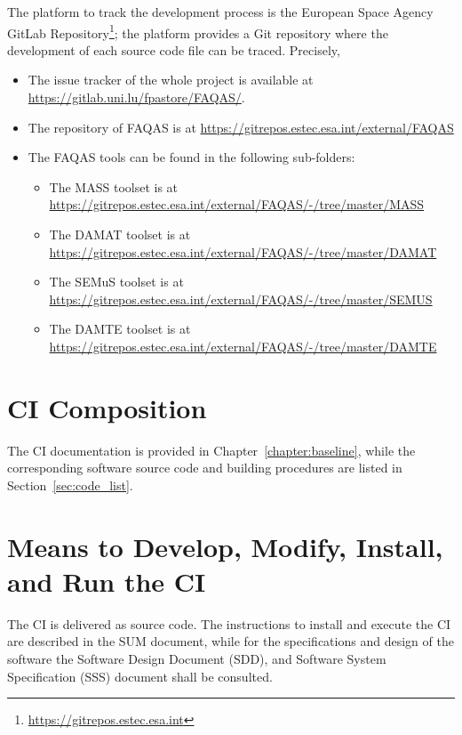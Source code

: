 The platform to track the development process is the European Space Agency GitLab Repository\footnote{\url{https://gitrepos.estec.esa.int}}; the platform provides a Git repository where the development of each source code file can be traced. Precisely,
\STARTCHANGEDFINAL
\begin{itemize}
\item The issue tracker of the whole project is available at \url{https://gitlab.uni.lu/fpastore/FAQAS/}.
\item The repository of FAQAS is at \url{https://gitrepos.estec.esa.int/external/FAQAS}
\item The FAQAS tools can be found in the following sub-folders:
\begin{itemize}
    \item The MASS toolset is at \url{https://gitrepos.estec.esa.int/external/FAQAS/-/tree/master/MASS}
    \item The DAMAT toolset is at \url{https://gitrepos.estec.esa.int/external/FAQAS/-/tree/master/DAMAT}
    \item The SEMuS toolset is at \url{https://gitrepos.estec.esa.int/external/FAQAS/-/tree/master/SEMUS}
    \item The DAMTE toolset is at \url{https://gitrepos.estec.esa.int/external/FAQAS/-/tree/master/DAMTE}
\end{itemize}
\end{itemize}
\ENDCHANGEDFINAL

\section{CI Composition}

The CI documentation is provided in Chapter~\ref{chapter:baseline}, while the corresponding software source code and building procedures are listed in Section~\ref{sec:code_list}.

\section{Means to Develop, Modify, Install, and Run the CI}

The CI is delivered as source code. The instructions to install and execute the CI are described in the SUM document, while for the specifications and design of the software the Software Design Document (SDD), and Software System Specification (SSS) document shall be consulted.

